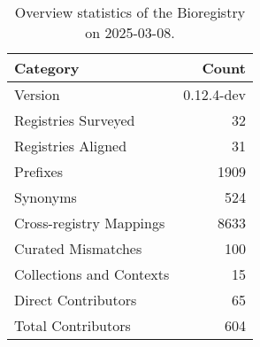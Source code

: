 \begin{table}
\caption{Overview statistics of the Bioregistry on 2025-03-08.}
\label{tab:bioregistry-summary}
\begin{tabular}{lr}
\toprule
Category & Count \\
\midrule
Version & 0.12.4-dev \\
Registries Surveyed & 32 \\
Registries Aligned & 31 \\
Prefixes & 1909 \\
Synonyms & 524 \\
Cross-registry Mappings & 8633 \\
Curated Mismatches & 100 \\
Collections and Contexts & 15 \\
Direct Contributors & 65 \\
Total Contributors & 604 \\
\bottomrule
\end{tabular}
\end{table}
